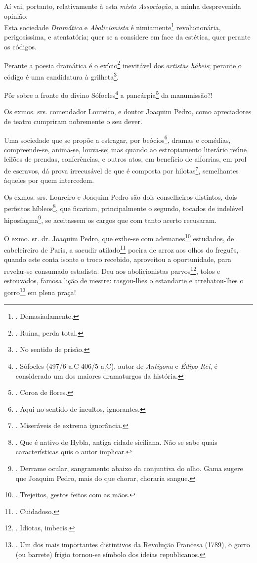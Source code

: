Aí vai, portanto, relativamente à esta \emph{mista Associação}, a minha
desprevenida opinião.\\
Esta sociedade \emph{Dramática} e \emph{Abolicionista} é
nimiamente\footnote{. Demasiadamente.} revolucionária, perigosíssima, e
atentatória; quer se a considere em face da estética, quer perante os
códigos.

Perante a poesia dramática é o exício\footnote{. Ruína, perda total.}
inevitável dos \emph{artistas hábeis}; perante o código é uma
candidatura à grilheta\footnote{. No sentido de prisão.}.

Pôr sobre a fronte do divino Sófocles\footnote{. Sófocles (497/6
  a.C-406/5 a.C), autor de \emph{Antígona} e \emph{Édipo Rei}, é
  considerado um dos maiores dramaturgos da história.} a
pancárpia\footnote{. Coroa de flores.} da manumissão?!

Os exmos. srs. comendador Loureiro, e doutor Joaquim Pedro, como
apreciadores de teatro cumpriram nobremente o seu dever.

Uma sociedade que se propõe a estragar, por beócios\footnote{. Aqui no
  sentido de incultos, ignorantes.}, dramas e comédias, compreende-se,
anima-se, louva-se; mas quando ao estropiamento literário reúne leilões
de prendas, conferências, e outros atos, em benefício de alforrias, em
prol de escravos, dá prova irrecusável de que é composta por
hilotas\footnote{. Miseráveis de extrema ignorância.}, semelhantes
àqueles por quem intercedem.

Os exmos. srs. Loureiro e Joaquim Pedro são dois conselheiros distintos,
dois perfeitos híbleos\footnote{. Que é nativo de Hybla, antiga cidade
  siciliana. Não se sabe quais características quis o autor implicar.},
que ficariam, principalmente o segundo, tocados de indelével
hiposfagma\footnote{. Derrame ocular, sangramento abaixo da conjuntiva
  do olho. Gama sugere que Joaquim Pedro, mais do que chorar, choraria
  sangue.}, se aceitassem os cargos que com tanto acerto recusaram.

O exmo. sr. dr. Joaquim Pedro, que exibe-se com ademanes\footnote{.
  Trejeitos, gestos feitos com as mãos.} estudados, de cabeleireiro de
Paris, a sacudir atilado\footnote{. Cuidadoso.} poeira de arroz aos
olhos do freguês, quando este conta isonte o troco recebido, aproveitou
a oportunidade, para revelar-se consumado estadista. Deu aos
abolicionistas parvos\footnote{. Idiotas, imbecis.}, tolos e estouvados,
famosa lição de mestre: rasgou-lhes o estandarte e arrebatou-lhes o
gorro\footnote{. Um dos mais importantes distintivos da Revolução
  Francesa (1789), o gorro (ou barrete) frígio tornou-se símbolo dos
  ideias republicanos.} em plena praça!

